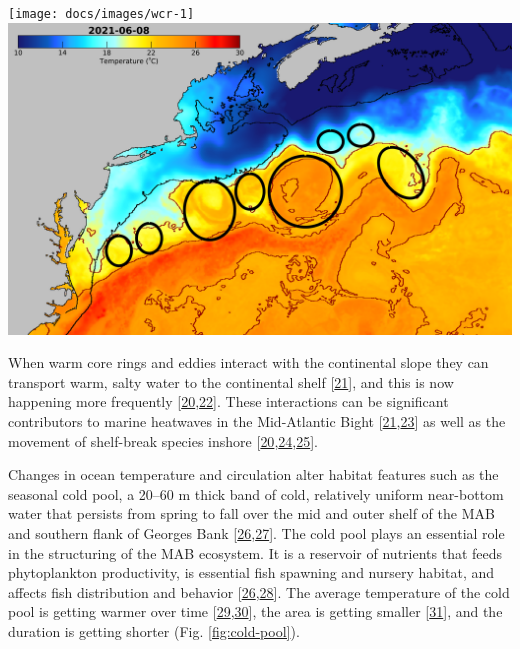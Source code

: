 \documentclass[
  10pt,
]{article}
\let\origfigure\figure
\let\endorigfigure\endfigure
\renewenvironment{figure}[1][2] {
    \expandafter\origfigure\expandafter[H]
} {
    \endorigfigure
}
\begin{document}
\begin{figure}

{\centering \texttt{[image: docs/images/wcr-1]} \includegraphics[width=0.49\linewidth]{images/D_20210608-MUR-SST-WCR} 

}

\caption{Warm core ring formation on the Northeast U.S. Shelf: Annual number of rings (left) and June 2021 rings (right), where the black line is the 200 m isobath (the shelf break) and the red lines are the 20 and 24 degree isotherms.}\label{fig:wcr}
\end{figure}

When warm core rings and eddies interact with the continental slope they
can transport warm, salty water to the continental shelf
{[}\protect\hyperlink{ref-chen_mesoscale_2022}{21}{]}, and this is now
happening more frequently
{[}\protect\hyperlink{ref-gawarkiewicz_changing_2018}{20},\protect\hyperlink{ref-gawarkiewicz_increasing_nodate}{22}{]}.
These interactions can be significant contributors to marine heatwaves
in the Mid-Atlantic Bight
{[}\protect\hyperlink{ref-chen_mesoscale_2022}{21},\protect\hyperlink{ref-gawarkiewicz_characteristics_2019}{23}{]}
as well as the movement of shelf-break species inshore
{[}\protect\hyperlink{ref-gawarkiewicz_changing_2018}{20},\protect\hyperlink{ref-potter_horizontal_2011}{24},\protect\hyperlink{ref-worm_predator_2003}{25}{]}.

Changes in ocean temperature and circulation alter habitat features such
as the seasonal cold pool, a 20--60 m thick band of cold, relatively
uniform near-bottom water that persists from spring to fall over the mid
and outer shelf of the MAB and southern flank of Georges Bank
{[}\protect\hyperlink{ref-lentz_seasonal_2017}{26},\protect\hyperlink{ref-chen_seasonal_2018}{27}{]}.
The cold pool plays an essential role in the structuring of the MAB
ecosystem. It is a reservoir of nutrients that feeds phytoplankton
productivity, is essential fish spawning and nursery habitat, and
affects fish distribution and behavior
{[}\protect\hyperlink{ref-lentz_seasonal_2017}{26},\protect\hyperlink{ref-miles_offshore_2021}{28}{]}.
The average temperature of the cold pool is getting warmer over time
{[}\protect\hyperlink{ref-miller_state-space_2016}{29},\protect\hyperlink{ref-du_pontavice_incorporating_nodate}{30}{]},
the area is getting smaller
{[}\protect\hyperlink{ref-friedland_middle_2022}{31}{]}, and the
duration is getting shorter (Fig. \ref{fig:cold-pool}).
\end{document}
